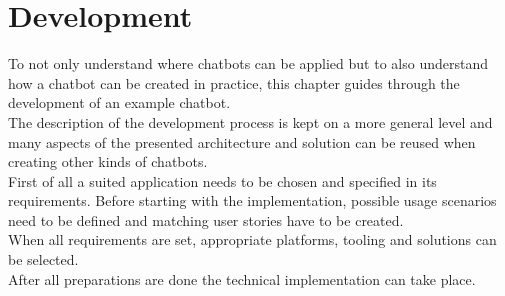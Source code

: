 \chapter{Development}


To not only understand where chatbots can be applied but to also understand how a chatbot can be created in practice, this chapter guides through the development of an example chatbot.
\\
The description of the development process is kept on a more general level and many aspects of the presented architecture and solution can be reused when creating other kinds of chatbots.
\\

First of all a suited application needs to be chosen and specified in its requirements.
Before starting with the implementation, possible usage scenarios need to be defined and matching user stories have to be created.
\\
When all requirements are set, appropriate platforms, tooling and solutions can be selected.
\\
After all preparations are done the technical implementation can take place.
